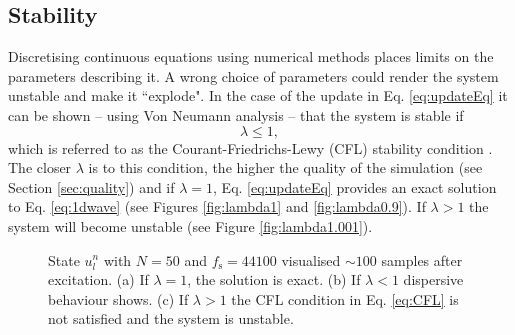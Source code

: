 \subsection{Stability}\label{sec:stability}
Discretising continuous equations using numerical methods places limits on the parameters describing it. A wrong choice of parameters could render the system unstable and make it ``explode". In the case of the update in Eq. \eqref{eq:updateEq} it can be shown -- using Von Neumann analysis -- that the system is stable if
\begin{equation}\label{eq:CFL}
    \lambda \leq 1,
\end{equation}
which is referred to as the Courant-Friedrichs-Lewy (CFL) stability condition \cite{Strikwerda1989}. The closer $\lambda$ is to this condition, the higher the quality of the simulation (see Section \ref{sec:quality}) and if $\lambda = 1$, Eq. \eqref{eq:updateEq} provides an exact solution to Eq. \eqref{eq:1dwave} %
(see Figures \ref{fig:lambda1} and \ref{fig:lambda0.9}). If $\lambda > 1$ the system will become unstable (see Figure \ref{fig:lambda1.001}).
\begin{figure}[h]
    \centering
    \caption{State $u_l^n$ with $N = 50$ and $f_\text{s} = 44100$ visualised $\sim\!100$ samples after excitation. (a) If $\lambda = 1$, the solution is exact. (b) If $\lambda < 1$ dispersive behaviour shows. (c) If $\lambda > 1$ the CFL condition in Eq. \eqref{eq:CFL} is not satisfied and the system is unstable.
    \label{fig:dispersion}}
\end{figure}

